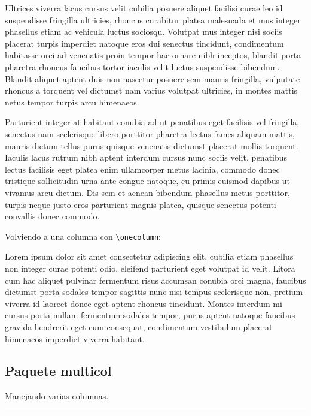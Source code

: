 \documentclass{article}
\begin{document}
	Ultrices viverra lacus cursus velit cubilia posuere aliquet facilisi curae leo id suspendisse fringilla ultricies, rhoncus curabitur platea malesuada et mus integer phasellus etiam ac vehicula luctus sociosqu. Volutpat mus integer nisi sociis placerat turpis imperdiet natoque eros dui senectus tincidunt, condimentum habitasse orci ad venenatis proin tempor hac ornare nibh inceptos, blandit porta pharetra rhoncus faucibus tortor iaculis velit luctus suspendisse bibendum. Blandit aliquet aptent duis non nascetur posuere sem mauris fringilla, vulputate rhoncus a torquent vel dictumst nam varius volutpat ultricies, in montes mattis netus tempor turpis arcu himenaeos.
		
	Parturient integer at habitant conubia ad ut penatibus eget facilisis vel fringilla, senectus nam scelerisque libero porttitor pharetra lectus fames aliquam mattis, mauris dictum tellus purus quisque venenatis dictumst placerat mollis torquent. Iaculis lacus rutrum nibh aptent interdum cursus nunc sociis velit, penatibus lectus facilisis eget platea enim ullamcorper metus lacinia, commodo donec tristique sollicitudin urna ante congue natoque, eu primis euismod dapibus ut vivamus arcu dictum. Dis sem et aenean bibendum phasellus metus porttitor, turpis neque justo eros parturient magnis platea, quisque senectus potenti convallis donec commodo.
	
	Volviendo a una columna con \verb|\onecolumn|:
	\onecolumn
	
	Lorem ipsum dolor sit amet consectetur adipiscing elit, cubilia etiam phasellus non integer curae potenti odio, eleifend parturient eget volutpat id velit. Litora cum hac aliquet pulvinar fermentum risus accumsan conubia orci magna, faucibus dictumst porta sodales tempor sagittis nunc nisi tempus scelerisque non, pretium viverra id laoreet donec eget aptent rhoncus tincidunt. Montes interdum mi cursus porta nullam fermentum sodales tempor, purus aptent natoque faucibus gravida hendrerit eget cum consequat, condimentum vestibulum placerat himenaeos imperdiet viverra habitant.
	
	\subsection{Paquete \ttfamily multicol}
	
	Manejando varias columnas.
	
	\noindent\rule{\textwidth}{2pt} %
	
\end{document}
